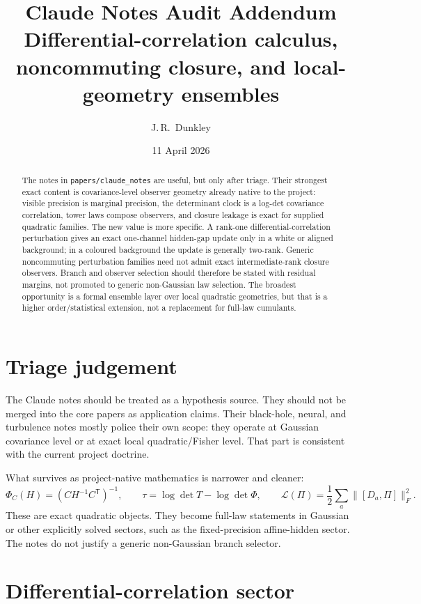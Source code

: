 \documentclass[11pt,a4paper]{article}
\title{\textbf{Claude Notes Audit Addendum}\\
\large{Differential-correlation calculus, noncommuting closure, and local-geometry ensembles}}
\author{J.\,R.~Dunkley}
\date{11 April 2026}
\numberwithin{equation}{section}
\theoremstyle{thmcompact}
\theoremstyle{remark}
\begin{document}
\maketitle

\begin{abstract}
The notes in \texttt{papers/claude\_notes} are useful, but only after triage.
Their strongest exact content is covariance-level observer geometry already
native to the project: visible precision is marginal precision, the determinant
clock is a log-det covariance correlation, tower laws compose observers, and
closure leakage is exact for supplied quadratic families. The new value is more
specific. A rank-one differential-correlation perturbation gives an exact
one-channel hidden-gap update only in a white or aligned background; in a
coloured background the update is generally two-rank. Generic noncommuting
perturbation families need not admit exact intermediate-rank closure observers.
Branch and observer selection should therefore be stated with residual margins,
not promoted to generic non-Gaussian law selection. The broadest opportunity is
a formal ensemble layer over local quadratic geometries, but that is a higher
order/statistical extension, not a replacement for full-law cumulants.
\end{abstract}

\section{Triage judgement}

The Claude notes should be treated as a hypothesis source. They should not be
merged into the core papers as application claims. Their black-hole, neural, and
turbulence notes mostly police their own scope: they operate at Gaussian
covariance level or at exact local quadratic/Fisher level. That part is
consistent with the current project doctrine.

What survives as project-native mathematics is narrower and cleaner:
\[
  \Phi_C(H)=(CH^{-1}C^{\mathsf T})^{-1},
  \qquad
  \tau=\log\det T-\log\det\Phi,
  \qquad
  \mathcal L(\Pi)=\frac12\sum_a\|[D_a,\Pi]\|_F^2.
\]
These are exact quadratic objects. They become full-law statements in Gaussian
or other explicitly solved sectors, such as the fixed-precision affine-hidden
sector. The notes do not justify a generic non-Gaussian branch selector.

\section{Differential-correlation sector}
\end{document}
